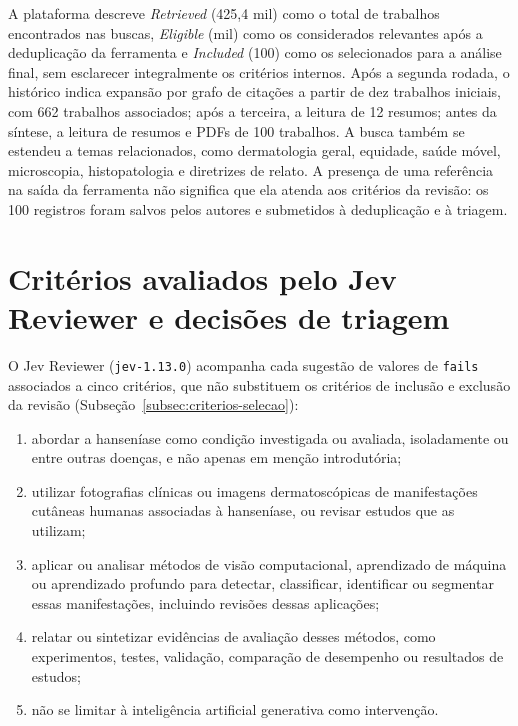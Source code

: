 A plataforma descreve \textit{Retrieved} (425,4 mil) como o total de
trabalhos encontrados nas buscas, \textit{Eligible} (mil) como os
considerados relevantes após a deduplicação da ferramenta e
\textit{Included} (100) como os selecionados para a análise final, sem
esclarecer integralmente os critérios internos. Após a segunda rodada, o
histórico indica expansão por grafo de citações a partir de dez trabalhos
iniciais, com 662 trabalhos associados; após a terceira, a leitura de 12
resumos; antes da síntese, a leitura de resumos e PDFs de 100 trabalhos.
A busca também se estendeu a temas relacionados, como dermatologia geral,
equidade, saúde móvel, microscopia, histopatologia e diretrizes de relato.
A presença de uma referência na saída da ferramenta não significa que ela
atenda aos critérios da revisão: os 100 registros foram salvos pelos
autores e submetidos à deduplicação e à triagem.

\section{Critérios avaliados pelo Jev Reviewer e decisões de triagem}

O Jev Reviewer (\texttt{jev-1.13.0}) acompanha cada sugestão de valores
de \texttt{fails} associados a cinco critérios, que não substituem os
critérios de inclusão e exclusão da revisão
(Subseção~\ref{subsec:criterios-selecao}):
\begin{enumerate}
	\item abordar a hanseníase como condição investigada ou avaliada,
	      isoladamente ou entre outras doenças, e não apenas em menção
	      introdutória;
	\item utilizar fotografias clínicas ou imagens dermatoscópicas de
	      manifestações cutâneas humanas associadas à hanseníase, ou revisar
	      estudos que as utilizam;
	\item aplicar ou analisar métodos de visão computacional, aprendizado de
	      máquina ou aprendizado profundo para detectar, classificar,
	      identificar ou segmentar essas manifestações, incluindo revisões
	      dessas aplicações;
	\item relatar ou sintetizar evidências de avaliação desses métodos, como
	      experimentos, testes, validação, comparação de desempenho ou
	      resultados de estudos;
	\item não se limitar à inteligência artificial generativa como
	      intervenção.
\end{enumerate}

